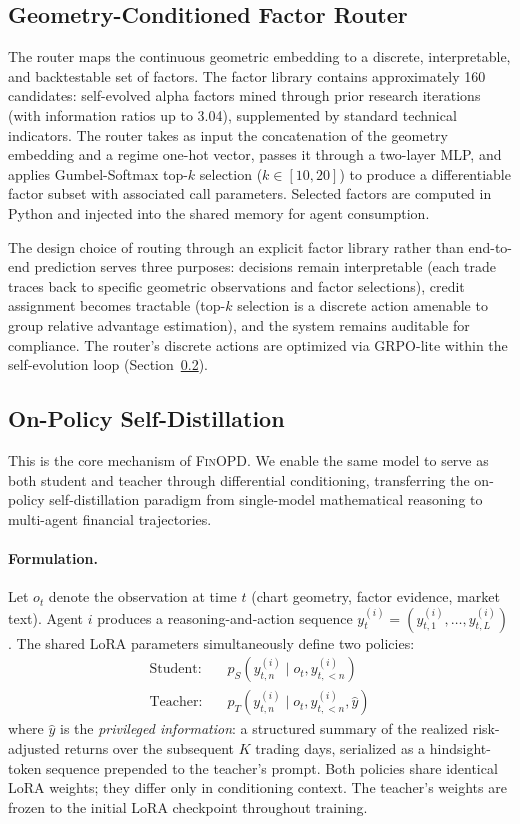 \subsection{Geometry-Conditioned Factor Router}
\label{sec:router}

The router maps the continuous geometric embedding to a discrete, interpretable, and backtestable set of factors. The factor library contains approximately 160 candidates: self-evolved alpha factors mined through prior research iterations (with information ratios up to 3.04), supplemented by standard technical indicators. The router takes as input the concatenation of the geometry embedding and a regime one-hot vector, passes it through a two-layer MLP, and applies Gumbel-Softmax top-$k$ selection ($k \in [10, 20]$) to produce a differentiable factor subset with associated call parameters. Selected factors are computed in Python and injected into the shared memory for agent consumption.

The design choice of routing through an explicit factor library rather than end-to-end prediction serves three purposes: decisions remain interpretable (each trade traces back to specific geometric observations and factor selections), credit assignment becomes tractable (top-$k$ selection is a discrete action amenable to group relative advantage estimation), and the system remains auditable for compliance. The router's discrete actions are optimized via GRPO-lite within the self-evolution loop (Section~\ref{sec:opsd}).

\subsection{On-Policy Self-Distillation}
\label{sec:opsd}

This is the core mechanism of \textsc{FinOPD}. We enable the same model to serve as both student and teacher through differential conditioning, transferring the on-policy self-distillation paradigm from single-model mathematical reasoning to multi-agent financial trajectories.

\paragraph{Formulation.} Let $o_t$ denote the observation at time $t$ (chart geometry, factor evidence, market text). Agent $i$ produces a reasoning-and-action sequence $y^{(i)}_t = (y^{(i)}_{t,1}, \ldots, y^{(i)}_{t,L})$. The shared LoRA parameters simultaneously define two policies:
\begin{align}
\text{Student:} \quad & p_S(y^{(i)}_{t,n} \mid o_t, y^{(i)}_{t,<n}) \\
\text{Teacher:} \quad & p_T(y^{(i)}_{t,n} \mid o_t, y^{(i)}_{t,<n}, \hat{y})
\end{align}
where $\hat{y}$ is the \emph{privileged information}: a structured summary of the realized risk-adjusted returns over the subsequent $K$ trading days, serialized as a hindsight-token sequence prepended to the teacher's prompt. Both policies share identical LoRA weights; they differ only in conditioning context. The teacher's weights are frozen to the initial LoRA checkpoint throughout training.


